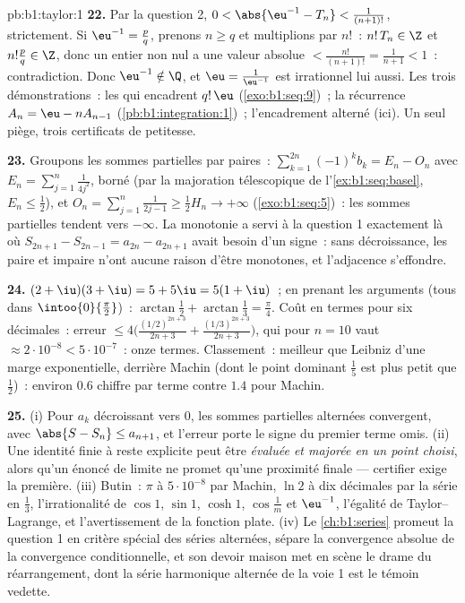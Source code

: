 \begin{solution}{pb:b1:taylor:1}
\textbf{22.} Par la question 2, $0 < \abs{\eu^{-1} - T_n} <
\frac{1}{(n+1)!}$, strictement. Si $\eu^{-1} = \frac pq$, prenons $n
\geq q$ et multiplions par $n!$~: $n!\,T_n \in \Z$ et $n!\frac pq
\in \Z$, donc un entier non nul a une valeur absolue $<
\frac{n!}{(n+1)!} = \frac{1}{n+1} < 1$~: contradiction. Donc
$\eu^{-1} \notin \Q$, et $\eu = \frac{1}{\eu^{-1}}$ est
irrationnel lui aussi. Les trois démonstrations~: les 
qui encadrent $q!\,\eu$ (\cref{exo:b1:seq:9})~; la récurrence
 $A_n = \eu - nA_{n-1}$ (\cref{pb:b1:integration:1})~;
l'encadrement alterné (ici). Un seul piège, trois certificats de
petitesse.

\textbf{23.} Groupons les sommes partielles par paires~: $\sum_{k=1}^{2n}
(-1)^k b_k = E_n - O_n$ avec $E_n = \sum_{j=1}^{n}
\frac{1}{4j^2}$, borné (par la majoration télescopique de
l'\cref{ex:b1:seq:basel}, $E_n \leq \frac12$), et $O_n =
\sum_{j=1}^{n}\frac{1}{2j-1} \geq \frac12 H_n \to +\infty$
(\cref{exo:b1:seq:5})~: les sommes partielles tendent vers $-\infty$.
La monotonie a servi à la question 1 exactement là où $S_{2n+1} -
S_{2n-1} = a_{2n} - a_{2n+1}$ avait besoin d'un signe~: sans
décroissance, les  paire et impaire n'ont aucune
raison d'être monotones, et l'adjacence s'effondre.

\textbf{24.} $(2+\iu)(3+\iu) = 5 + 5\iu = 5(1+\iu)$~; en prenant les
arguments (tous dans $\intoo{0}{\frac\pi2}$)~: $\arctan\frac12 +
\arctan\frac13 = \frac\pi4$. Coût en termes pour six décimales~:
erreur $\leq 4\bigl(\frac{(1/2)^{2n+3}}{2n+3} +
\frac{(1/3)^{2n+3}}{2n+3}\bigr)$, qui pour $n = 10$ vaut
$\approx 2\cdot10^{-8} < 5\cdot10^{-7}$~: onze termes. Classement~:
meilleur que Leibniz d'une marge exponentielle, derrière Machin
(dont le point dominant $\frac15$ est plus petit que $\frac12$)~:
environ $0.6$ chiffre par terme contre $1.4$ pour Machin.

\textbf{25.} (i) Pour $a_k$ décroissant vers $0$, les sommes
partielles alternées convergent, avec $\abs{S - S_n} \leq a_{n+1}$, et
l'erreur porte le signe du premier terme omis. (ii) Une identité finie
à reste explicite peut être \emph{évaluée et majorée en un point
choisi}, alors qu'un énoncé de limite ne promet qu'une proximité
finale --- certifier exige la première. (iii) Butin~: $\pi$ à
$5\cdot10^{-8}$ par Machin, $\ln 2$ à dix décimales par la série en
$\frac13$, l'irrationalité de $\cos 1$, $\sin 1$, $\cosh 1$,
$\cos\frac1m$ et $\eu^{-1}$, l'égalité de Taylor--Lagrange, et
l'avertissement de la fonction plate. (iv) Le
\cref{ch:b1:series} promeut la question 1 en critère spécial des
séries alternées, sépare la convergence absolue de la convergence
conditionnelle, et son devoir maison met en scène le drame du
réarrangement, dont la série harmonique alternée de la voie 1 est le
témoin vedette.
\end{solution}
